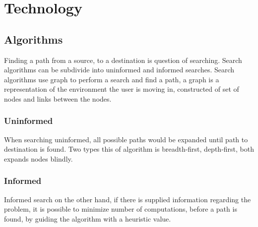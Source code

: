 \section{Technology}

\subsection{Algorithms}

Finding a path from a source, to a destination is question of searching. Search algorithms can be subdivide into uninformed and informed searches. Search algorithms use graph to perform a search and find a path, a graph is a representation of the environment the user is moving in, constructed of set of nodes and links between the nodes. 

\subsubsection{Uninformed}

When searching uninformed, all possible paths would be expanded until path to destination is found. Two types this of algorithm is breadth-first, depth-first, both expands nodes blindly.

\subsubsection{Informed}

Informed search on the other hand, if there is supplied information regarding the problem, it is possible to minimize number of computations, before a path is found, by guiding the algorithm with a heuristic value.